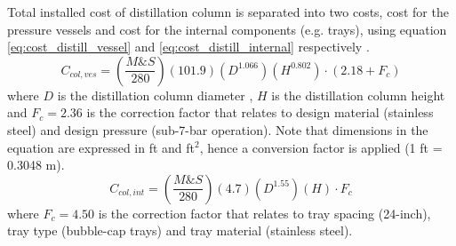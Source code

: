 \documentclass[11pt,oneside]{article}
\begin{document}
	\noindent Total installed cost of distillation column is separated into two costs, cost for the pressure vessels and cost for the internal components (e.g. trays), using equation \ref{eq:cost_distill_vessel} and \ref{eq:cost_distill_internal} respectively \citep{douglas1988}.
	\begin{equation}
	    C_{col,ves} = \left(\frac{M\&S}{280}\right)\left(101.9\right)\left(D^{1.066}\right)\left(H^{0.802}\right)\cdot (2.18 + F_c)
	    \label{eq:cost_distill_vessel}
	\end{equation}
	where $D$ is the distillation column diameter , $H$ is the distillation column height and $F_c = 2.36$ is the correction factor that relates to design material (stainless steel) and design pressure (sub-7-bar operation). Note that dimensions in the equation are expressed in ft and ft$^2$, hence a conversion factor is applied (1 ft = 0.3048 m).\\
	\begin{equation}
	    C_{col,int} = \left(\frac{M\&S}{280}\right)\left(4.7\right)\left(D^{1.55}\right)\left(H\right)\cdot F_c
	    \label{eq:cost_distill_internal}
	\end{equation}
	where $F_c = 4.50$ is the correction factor that relates to tray spacing (24-inch), tray type (bubble-cap trays) and tray material (stainless steel). \\
    
\end{document}
